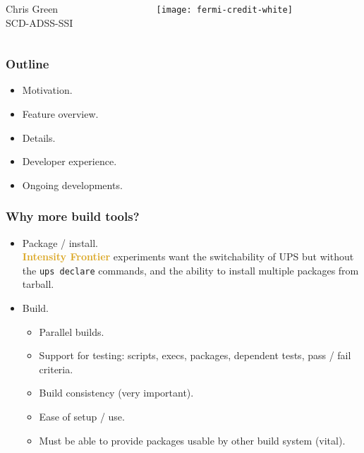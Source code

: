 \documentclass[xcolor={dvipsnames,table},c,compress,colorlinks]{beamer}
\newcommand{\cmd}[1]{\texttt{#1}\xspace}
\newcommand{\expt}[1]{\textbf{\textcolor{Goldenrod}{#1}}\xspace}
\newcommand{\IF}{\expt{Intensity Frontier}}
\begin{document}
\begin{frame}
\begin{columns}[onlytextwidth,b]
\begin{column}{0.3\textwidth}
    \end{column}
  \end{columns}
  \vspace{.3in}
  \begin{columns}[onlytextwidth,b]

    \begin{column}{0.45\textwidth}
      Chris Green \\
      SCD-ADSS-SSI
    \end{column}
    \begin{column}{0.55\textwidth}
      \hfill\mbox{\texttt{[image: fermi-credit-white]}} \\
    \end{column}
  \end{columns}
\end{frame}

\begin{frame}\frametitle{Outline}
  \begin{itemize}
  \item Motivation.
  \item Feature overview.
  \item Details.
  \item Developer experience.
  \item Ongoing developments.
  \end{itemize}
\end{frame}

\begin{frame}\frametitle{Why more build tools?}
  \begin{itemize}
  \item Package / install. \\
    \IF experiments want the switchability of UPS but without the
    \cmd{ups declare} commands, and the ability to install multiple
    packages from tarball.
  \item Build.
    \begin{itemize}
    \item Parallel builds.
    \item Support for testing: scripts, execs, packages, dependent
      tests, pass / fail criteria.
    \item Build consistency (very important).
    \item Ease of setup / use.
    \item Must be able to provide packages usable by other build system (vital).
    \end{itemize}
  \end{itemize}
\end{frame}
\end{document}
